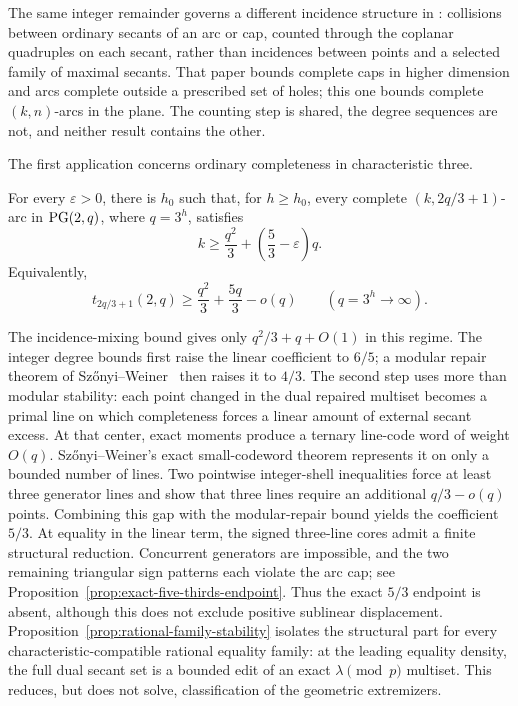 The same integer remainder governs a different incidence structure in
\cite{RuddSecantDefects}: collisions between ordinary secants of an arc or
cap, counted through the coplanar quadruples on each secant, rather than
incidences between points and a selected family of maximal secants.  That
paper bounds complete caps in higher dimension and arcs complete outside a
prescribed set of holes; this one bounds complete \((k,n)\)-arcs in the
plane.  The counting step is shared, the degree sequences are not, and
neither result contains the other.

The first application concerns ordinary completeness in characteristic
three.

\begin{theorem}\label{thm:characteristic-three}
For every \(\varepsilon>0\), there is \(h_0\) such that, for \(h\ge h_0\),
every complete \((k,2q/3+1)\)-arc in \(\mathrm{PG}(2,q)\), where \(q=3^h\), satisfies
\begin{equation}\label{eq:characteristic-three-bound}
 k\ge \frac{q^2}{3}+\left(\frac53-\varepsilon\right)q.
\end{equation}
Equivalently,
\[
 t_{2q/3+1}(2,q)\ge \frac{q^2}{3}+\frac{5q}{3}-o(q)
 \qquad (q=3^h\to\infty).
\]
\end{theorem}

The incidence-mixing bound gives only \(q^2/3+q+O(1)\) in this regime.  The
integer degree bounds first raise the linear coefficient to \(6/5\); a
modular repair theorem of Sz\H{o}nyi--Weiner~\cite{SWmodp} then raises it to
\(4/3\).  The second step uses more than modular stability: each point changed
in the dual repaired multiset becomes a primal line on which completeness
forces a linear amount of external secant excess.
At that center, exact moments produce a ternary line-code word of weight
\(O(q)\).  Sz\H{o}nyi--Weiner's exact small-codeword theorem represents it on
only a bounded number of lines.  Two pointwise integer-shell inequalities
force at least three generator lines and show that three lines require an
additional \(q/3-o(q)\) points.  Combining this gap with the modular-repair
bound yields the coefficient \(5/3\).
At equality in the linear term, the signed three-line cores admit a finite
structural reduction.  Concurrent generators are impossible, and the two
remaining triangular sign patterns each violate the arc cap; see
Proposition~\ref{prop:exact-five-thirds-endpoint}.  Thus the exact
\(5/3\) endpoint is absent, although this does not exclude positive
sublinear displacement.
Proposition~\ref{prop:rational-family-stability} isolates the structural part
for every characteristic-compatible rational equality family: at the leading
equality density, the full dual secant set is a bounded edit of an exact
\(\lambda\pmod p\) multiset.  This reduces, but does not solve, classification
of the geometric extremizers.

